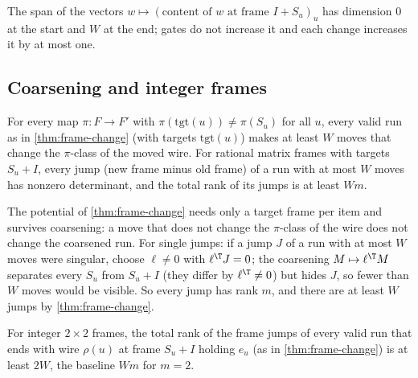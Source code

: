 \begin{outline}
The span of the vectors $w\mapsto(\text{content of }w\text{ at frame }I+S_u)_u$ has dimension $0$ at the
start and $W$ at the end; gates do not increase it and each change increases it by at most one.
\end{outline}

\subsection{Coarsening and integer frames}

\begin{theorem}[Coarsening]\label{thm:coarsening}
For every map $\pi:F\to F'$ with $\pi(\mathrm{tgt}(u))\ne\pi(S_u)$ for all $u$, every valid run as in
\cref{thm:frame-change} (with targets $\mathrm{tgt}(u)$) makes at least $W$ moves that change the
$\pi$-class of the moved wire. For rational matrix frames with targets $S_u+I$, every jump (new frame minus old frame) of a run with at most $W$ moves has nonzero determinant, and the total rank of its jumps is at least $Wm$.
\end{theorem}

\begin{outline}
The potential of \cref{thm:frame-change} needs only a target frame per item and survives coarsening: a move
that does not change the $\pi$-class of the wire does not change the coarsened run. For single jumps: if a jump $J$ of a run with at most $W$ moves were singular, choose $\ell\ne0$ with
$\ell^{\T}J=0$; the coarsening $M\mapsto\ell^{\T}M$ separates every $S_u$ from $S_u+I$ (they differ by
$\ell^{\T}\ne0$) but hides $J$, so fewer than $W$ moves would be visible. So every jump has rank $m$, and
there are at least $W$ jumps by \cref{thm:frame-change}.
\end{outline}

\begin{theorem}\label{thm:mod2}
For integer $2\times2$ frames, the total rank of the frame jumps of every valid run that ends with wire
$\rho(u)$ at frame $S_u+I$ holding $e_u$ (as in \cref{thm:frame-change}) is at least $2W$, the baseline $Wm$ for $m=2$.
\end{theorem}

